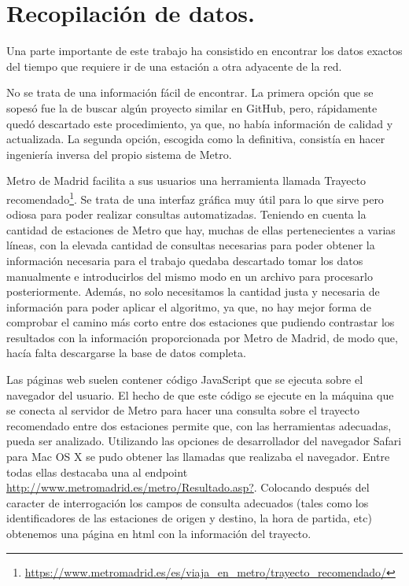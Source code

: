 \documentclass[spanish, a4paper, 12pt] {article}
\begin{document}
\section{Recopilación de datos.}
Una parte importante de este trabajo ha consistido en encontrar los datos exactos del tiempo que requiere ir de una estación a otra adyacente de la red.\\ \par
No se trata de una información fácil de encontrar. La primera opción que se sopesó fue la de buscar algún proyecto similar en GitHub, pero, rápidamente quedó descartado este procedimiento, ya que, no había información de calidad y actualizada. La segunda opción, escogida como la definitiva, consistía en hacer ingeniería inversa del propio sistema de Metro.\\ \par
Metro de Madrid facilita a sus usuarios una herramienta llamada Trayecto recomendado\footnote{\url{https://www.metromadrid.es/es/viaja_en_metro/trayecto_recomendado/}}. Se trata de una interfaz gráfica muy útil para lo que sirve pero odiosa para poder realizar consultas automatizadas. Teniendo en cuenta la cantidad de estaciones de Metro que hay, muchas de ellas pertenecientes a varias líneas, con la elevada cantidad de consultas necesarias para poder obtener la información necesaria para el trabajo quedaba descartado tomar los datos manualmente e introducirlos del mismo modo en un archivo para procesarlo posteriormente. Además, no solo necesitamos la cantidad justa y necesaria de información para poder aplicar el algoritmo, ya que, no hay mejor forma de comprobar el camino más corto entre dos estaciones que pudiendo contrastar los resultados con la información proporcionada por Metro de Madrid, de modo que, hacía falta descargarse la base de datos completa.\\ \par
Las páginas web suelen contener código JavaScript que se ejecuta sobre el navegador del usuario. El hecho de que este código se ejecute en la máquina que se conecta al servidor de Metro para hacer una consulta sobre el trayecto recomendado entre dos estaciones permite que, con las herramientas adecuadas, pueda ser analizado. Utilizando las opciones de desarrollador del navegador Safari para Mac OS X se pudo obtener las llamadas que realizaba el navegador. Entre todas ellas destacaba una al endpoint \url{http://www.metromadrid.es/metro/Resultado.asp?}. Colocando después del caracter de interrogación los campos de consulta adecuados (tales como los identificadores de las estaciones de origen y destino, la hora de partida, etc) obtenemos una página en html con la información del trayecto.\\ \par
\end{document}
